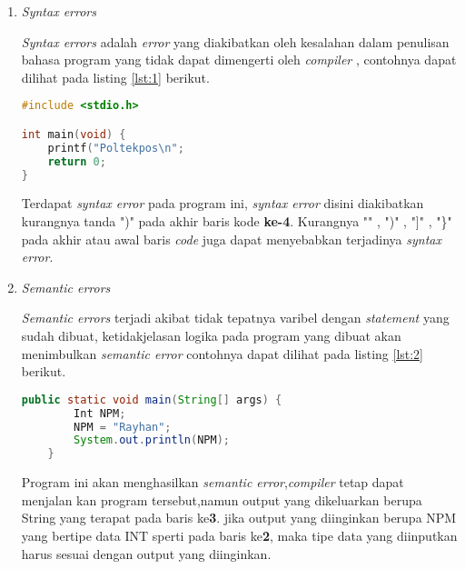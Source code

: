 \begin{enumerate}
\item 
\textit{Syntax errors}
\par 
\textit{Syntax errors} adalah \textit{error} yang diakibatkan oleh kesalahan dalam penulisan bahasa program yang tidak dapat dimengerti oleh \textit{compiler} , contohnya dapat dilihat pada listing \ref{lst:1} berikut.

\begin{lstlisting}[language=C, caption=Contoh Syntax errors,label={lst:1}]
#include <stdio.h>

int main(void) {
    printf("Poltekpos\n";
    return 0;
}
\end{lstlisting}
 
Terdapat \textit{syntax error} pada program ini, \textit{syntax error} disini diakibatkan kurangnya tanda ")" pada akhir baris kode \textbf{ke-4}. Kurangnya "\;" , ")" , "]" , "\}" pada akhir atau awal baris \textit{code} juga dapat menyebabkan terjadinya \textit{syntax error}.

\item 
\textit{Semantic errors}
\par 
\textit{Semantic errors} terjadi akibat tidak tepatnya varibel dengan \textit{statement} yang sudah dibuat, ketidakjelasan logika pada program yang dibuat akan menimbulkan \textit{semantic error} contohnya dapat dilihat pada listing \ref{lst:2} berikut.

\begin{lstlisting}[language=Java,caption=Contoh \textit{Semantic errors},label={lst:2}]
public static void main(String[] args) {	
		Int NPM;		
		NPM = "Rayhan";
		System.out.println(NPM);
	}
\end{lstlisting}
\par 
Program ini akan menghasilkan \textit{semantic error},\textit{compiler} tetap dapat menjalan kan program tersebut,namun output yang dikeluarkan berupa String yang terapat pada baris ke\textbf{3}. jika output yang diinginkan berupa NPM yang bertipe data INT sperti pada baris ke\textbf{2}, maka tipe data yang diinputkan harus sesuai dengan output yang diinginkan.
\end{enumerate}